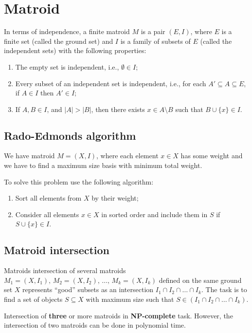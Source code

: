 \section*{Matroid}

In terms of independence, a finite matroid $M$ is a pair $(E, I)$, where 
$E$ is a finite set (called the ground set) and 
$I$ is a family of subsets of $E$ (called the independent sets) 
with the following properties:

\begin{enumerate}
\item The empty set is independent, i.e., $\emptyset \in I$;
\item Every subset of an independent set is independent, i.e., for each $A' \subseteq A \subseteq E$, if $A \in I$ then $A' \in I$;
\item If $A, B \in I$, and $|A| > |B|$, then there exists $x \in A \setminus B$ such that $B \cup \{ x \} \in I$.
\end{enumerate}

\subsection*{Rado-Edmonds algorithm}
We have matroid $M = (X, I)$, where each element $x \in X$ has some weight and 
we have to find a maximum size basis with minimum total weight.

To solve this problem use the following algorithm:
\begin{enumerate}
\item Sort all elements from $X$ by their weight;
\item Consider all elements $x \in X$ in sorted order and include them in $S$ if $S \cup \{ x \} \in I$.
\end{enumerate}

\subsection*{Matroid intersection}
Matroids intersection of several matroids $M_1 = (X, I_1), \, M_2 = (X, I_2), \, \dots , \, M_k = (X, I_k)$ defined on the same ground set $X$ represents “good” subsets as an intersection
$I_1 \cap I_2 \cap \dots \cap I_k$. 
The task is to find a set of objects $S \subseteq X$ with maximum size such that $S \in (I_1 \cap I_2 \cap \dots \cap I_k)$. 

Intersection of \textbf{three} or more matroids in \textbf{NP-complete} task.
However, the intersection of two matroids can be done in polynomial time.

